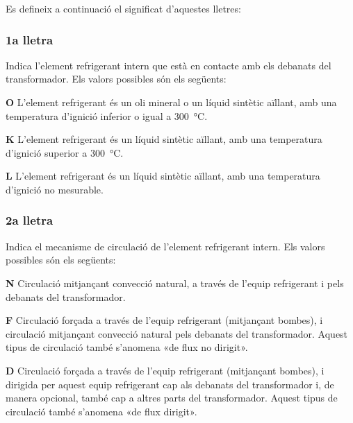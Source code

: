 Es defineix a continuació el significat d'aquestes lletres:

\subsubsection*{1a lletra}
Indica l'element refrigerant intern que està en
contacte amb els debanats del transformador. Els valors possibles
són els següents:

\begin{list}{}
   {\setlength{\labelwidth}{10mm} \setlength{\leftmargin}{10mm} \setlength{\labelsep}{2mm}}
   \item[\textbf{O}] L'element refrigerant és un oli mineral o un líquid sintètic aïllant, amb una temperatura d'ignició
   inferior o igual a \qty{300}{\degreeCelsius}.
   \item[\textbf{K}] L'element refrigerant és un líquid sintètic aïllant, amb una temperatura d'ignició
   superior a \qty{300}{\degreeCelsius}.
   \item[\textbf{L}] L'element refrigerant és un líquid sintètic aïllant, amb una temperatura d'ignició
   no mesurable.
\end{list}
  

\subsubsection*{2a lletra}
Indica el mecanisme de circulació de l'element
refrigerant intern. Els valors possibles són els següents:

\begin{list}{}
   {\setlength{\labelwidth}{10mm} \setlength{\leftmargin}{10mm} \setlength{\labelsep}{2mm}}
   \item[\textbf{N}] Circulació mitjançant convecció natural,
    a través de l'equip refrigerant i pels debanats del transformador.
   \item[\textbf{F}] Circulació forçada a través de l'equip refrigerant (mitjançant bombes),
    i circulació mitjançant convecció natural pels debanats del
    transformador. Aquest tipus de circulació també s'anomena «de flux no
    dirigit».
   \item[\textbf{D}] Circulació forçada a través de l'equip refrigerant (mitjançant bombes),
    i dirigida per aquest equip refrigerant cap als debanats del
    transformador i, de manera opcional, també cap a altres parts del transformador. Aquest
    tipus de circulació també s'anomena «de flux dirigit».
\end{list}
  

